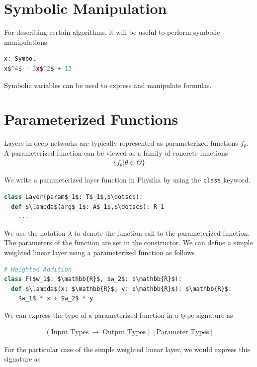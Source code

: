 \documentclass[book.tex]{subfiles}
\begin{document}
\section{Symbolic Manipulation}

For describing certain algorithms, it will be useful to perform symbolic manipulations.

\begin{lstlisting}[language=python]
x: Symbol
x$^4$ - 3x$^2$ + 13
\end{lstlisting}

Symbolic variables can be used to express and manipulate formulas.

\section{Parameterized Functions}

Layers in deep networks are typically represented as parameterized functions $f_\theta$. A parameterized function can be viewed as a family of concrete functions
\begin{align}
    \{ f_{\theta} | \theta \in \Theta \}
\end{align}

We write a parameterized layer function in Physika by using the \lstinline{class} keyword. 
\begin{lstlisting}[language=python]
class Layer(param$_1$: T$_1$,$\dotsc$):
  def $\lambda$(arg$_1$: A$_1$,$\dotsc$): R_1
    ...
\end{lstlisting}

We use the notation $\lambda$ to denote the function call to the parameterized function. The parameters of the function are set in the constructor. We can define a simple weighted linear layer using a parameterized function as follows

\begin{lstlisting}[language=python]
# Weighted Addition
class F($w_1$: $\mathbb{R}$, $w_2$: $\mathbb{R}$):
  def $\lambda$(x: $\mathbb{R}$, y: $\mathbb{R}$): $\mathbb{R}$:
    $w_1$ * x + $w_2$ * y
\end{lstlisting}

We can express the type of a parameterized function in a type signature as 

\begin{align}
    (\textrm{Input Types}\ \to \ \textrm{Output Types})[\textrm{Parameter Types}]
\end{align}

For the particular case of the simple weighted linear layer, we would express this signature as
\end{document}
